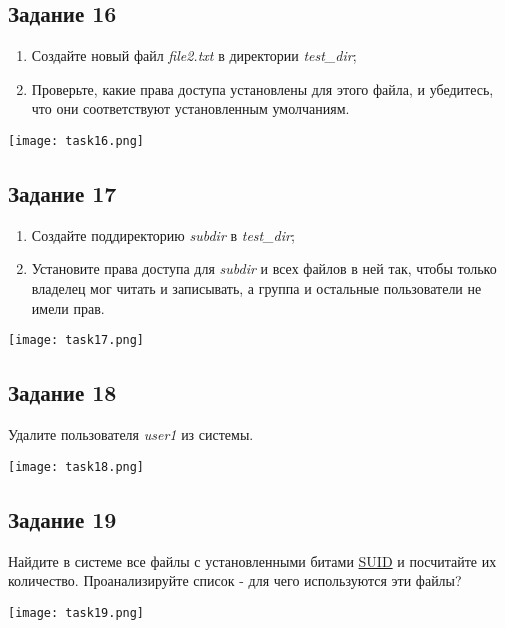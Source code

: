 \documentclass[12pt, a4paper]{report}
\begin{document}
	\subsection*{Задание 16}
	\begin{enumerate}
		\item Создайте новый файл \textit{file2.txt} в директории \textit{test\_dir};
		\item Проверьте, какие права доступа установлены для этого файла, и убедитесь, что они соответствуют установленным умолчаниям.
	\end{enumerate}
	\lstset{style=mystyle}
	
	\begin{center}
		\texttt{[image: task16.png]}
	\end{center}

	\subsection*{Задание 17}
	\begin{enumerate}
		\item Создайте поддиректорию \textit{subdir} в \textit{test\_dir};
		\item Установите права доступа для \textit{subdir} и всех файлов в ней так, чтобы только владелец мог читать и записывать, а группа и остальные пользователи не имели прав.
	\end{enumerate}
	\lstset{style=mystyle}
	
	\begin{center}
		\texttt{[image: task17.png]}
	\end{center}

	\subsection*{Задание 18}
	Удалите пользователя \textit{user1} из системы.
	\lstset{style=mystyle}
	
	\begin{center}
		\texttt{[image: task18.png]}
	\end{center}

	\subsection*{Задание 19}
	Найдите в системе все файлы с установленными битами \underline{SUID} и посчитайте их количество. Проанализируйте список - для чего используются эти файлы?
	\lstset{style=mystyle}
	
	\begin{center}
		\texttt{[image: task19.png]}
	\end{center}
\end{document}
